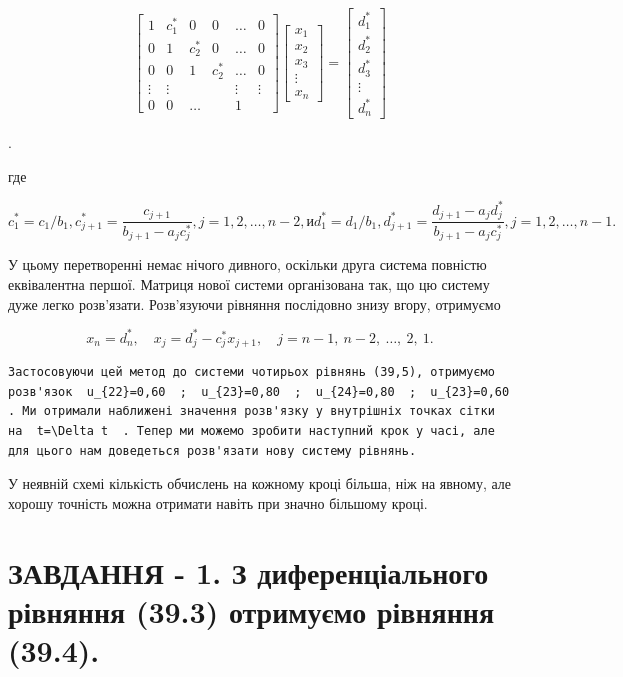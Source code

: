\documentclass[
  ukrainian,
]{article}
\begin{document}
\[
\begin{bmatrix} 1 & c_1^* & 0 & 0 & \dots & 0 \\ 0 & 1 & c_2^* & 0 & \dots & 0 \\ 0 & 0 & 1 & c_2^* & \dots & 0 \\ \vdots & \vdots & & & \vdots & \vdots \\ 0 & 0 & \dots & & 1 \end{bmatrix}
\begin{bmatrix} x_1 \\ x_2 \\ x_3 \\ \vdots \\ x_n \end{bmatrix}
=
\begin{bmatrix} d_1^* \\ d_2^* \\ d_3^* \\ \vdots \\ d_n^* \end{bmatrix}
\]

.

где

\[
c_1^* = c_1/b_1
,  c_{j+1}^* = \frac{c_{j+1}}{b_{j+1} - a_j c_j^*}  ,  j = 1, 2, \ldots, n-2  , и  d_1^* = d_1/b_1  ,  d_{j+1}^* = \frac{d_{j+1} - a_j d_j^*}{b_{j+1} - a_j c_j^*}  ,  j = 1,  2, \ldots, n-1  .
\]

У цьому перетворенні немає нічого дивного, оскільки друга система
повністю еквівалентна першої. Матриця нової системи організована так, що
цю систему дуже легко розв'язати. Розв'язуючи рівняння послідовно знизу
вгору, отримуємо

\[
x_n = d_n^*, \quad x_j = d_j^* - c_j^* x_{j+1}, \quad j = n-1, \ n-2, \ \dots, \ 2, \ 1.
\]

\begin{verbatim}
Застосовуючи цей метод до системи чотирьох рівнянь (39,5), отримуємо розв'язок  u_{22}=0,60  ;  u_{23}=0,80  ;  u_{24}=0,80  ;  u_{23}=0,60  . Ми отримали наближені значення розв'язку у внутрішніх точках сітки на  t=\Delta t  . Тепер ми можемо зробити наступний крок у часі, але для цього нам доведеться розв'язати нову систему рівнянь.
\end{verbatim}

У неявній схемі кількість обчислень на кожному кроці більша, ніж на
явному, але хорошу точність можна отримати навіть при значно більшому
кроці.

\section{ЗАВДАННЯ - 1. З диференціального рівняння (39.3) отримуємо
рівняння
(39.4).}\label{ux437ux430ux432ux434ux430ux43dux43dux44f---1.-ux437-ux434ux438ux444ux435ux440ux435ux43dux446ux456ux430ux43bux44cux43dux43eux433ux43e-ux440ux456ux432ux43dux44fux43dux43dux44f-39.3-ux43eux442ux440ux438ux43cux443ux454ux43cux43e-ux440ux456ux432ux43dux44fux43dux43dux44f-39.4.}
\end{document}
